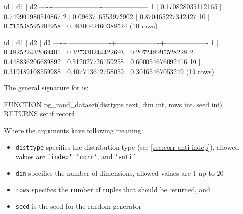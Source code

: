 \begin{interactive}
 id |         d1         |         d2
----+--------------------+--------------------
  1 |  0.170828036112165 |  0.749901980510867
  2 | 0.0963716553972902 |  0.870465227342427
\ellipsis{}
 10 |  0.715538595204958 | 0.0830042460388524
(10 rows)

 id |        d1         |        d2         |        d3
----+-------------------+-------------------+-------------------
  1 | 0.482522432069401 | 0.327330244422693 | 0.207248995528228
  2 | 0.448836206689892 | 0.512027726159258 | 0.600054676092416
\ellipsis{}
 10 | 0.319189108559988 | 0.407713612758059 |  0.30165467053249
(10 rows)

\end{interactive}

\noindent
The general signature for  is:
\begin{interactive}
FUNCTION pg_rand_dataset(disttype text, dim int, rows int, seed int)
RETURNS setof record
\end{interactive}

\noindent
Where the arguments have following meaning:
\begin{itemize}
\item \texttt{disttype} 
specifies the distribution type (see \autoref{sec:corr-anti-indep}),
allowed values are \texttt{'indep'}, \texttt{'corr'}, and
\texttt{'anti'}

\item \texttt{dim} specifies the number of dimensions, allowed values are 1 up to 20 

\item \texttt{rows} specifies the number of tuples that should be returned, and 

\item \texttt{seed} is the seed for the random generator
\end{itemize}

